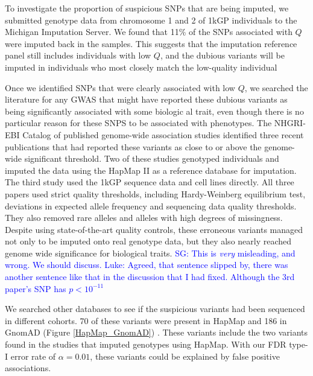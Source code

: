 \documentclass[9pt,lineno]{elife}
\newcommand{\sgcomment}[1]{\textcolor{blue}{SG: #1}}
\newcommand{\luke}[1]{\textcolor{blue}{Luke: #1}}
\begin{document}
To investigate the proportion of suspicious SNPs that are being imputed, we submitted genotype data from chromosome 1 and 2 of 1kGP individuals to the Michigan Imputation Server.
We found that 11\% of the SNPs associated with $Q$ were imputed back in the samples. 
This suggests that the imputation reference panel still includes individuals with low $Q$, and the dubious variants will be imputed in individuals who most closely match the low-quality individual

Once we identified SNPs that were clearly associated with low $Q$, we searched the literature for any GWAS that might have reported these dubious variants as being significantly associated with some biologic al trait, even though there is no particular reason for these SNPS to be associated with phenotypes.
The NHGRI-EBI Catalog of published genome-wide association studies identified three recent publications that had reported these variants as close to or above the genome-wide significant threshold.
Two of these studies genotyped individuals and imputed the data using the HapMap II as a reference  database for imputation.
The third study used the 1kGP sequence data and cell lines directly.
All three papers used strict quality thresholds, including Hardy-Weinberg equilibrium test, deviations in expected allele frequency and sequencing data quality thresholds.
They also removed rare alleles and alleles with high degrees of missingness.
Despite using state-of-the-art quality controls, these erroneous variants managed not only to be imputed onto real genotype data, but they also nearly reached genome wide significance for biological traits. 
\sgcomment{This is \emph{very} misleading, and wrong. We should discuss. }
\luke{Agreed, that sentence slipped by, there was another sentence like that in the discussion that I had fixed. Although the 3rd paper's SNP has $p < 10^{-11}$ }


We searched other databases to see if the suspicious variants had been sequenced in different cohorts.
70 of these variants were present in HapMap and 186 in GnomAD (Figure \ref{HapMap_GnomAD}) \citep{HapMap2005,Lek2016}.
These variants include the two variants found in the studies that imputed genotypes using HapMap.
With our FDR type-I error rate of $\alpha = 0.01$, these variants could be explained by false positive associations.

\end{document}
